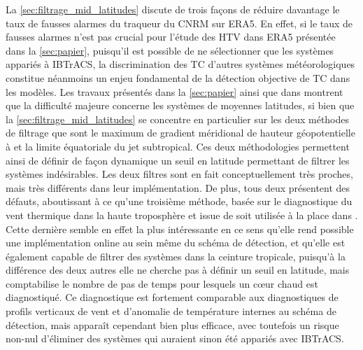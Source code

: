 \documentclass[../main.tex]{subfiles}
\begin{document}
La \cref{sec:filtrage_mid_latitudes} discute de trois façons de réduire davantage le taux de fausses alarmes du traqueur du CNRM sur ERA5. En effet, si le taux
de fausses alarmes n'est pas crucial pour l'étude des HTV dans ERA5 présentée dans la \cref{sec:papier}, puisqu'il est possible de ne sélectionner que les
systèmes appariés à IBTrACS, la discrimination des TC d'autres systèmes météorologiques constitue néanmoins un enjeu fondamental de la détection objective de TC
dans les modèles. Les travaux présentés dans la \cref{sec:papier} ainsi que dans \textcite{bourdin_intercomparison_2022} montrent que la difficulté majeure
concerne les systèmes de moyennes latitudes, si bien que la \cref{sec:filtrage_mid_latitudes} se concentre en particulier sur les deux méthodes de filtrage que
sont le maximum de gradient méridional de hauteur géopotentielle à  et la limite équatoriale du jet subtropical. Ces deux méthodologies permettent
ainsi de définir de façon dynamique un seuil en latitude permettant de filtrer les systèmes indésirables. Les deux filtres sont en fait conceptuellement très
proches, mais très différents dans leur implémentation. De plus, tous deux présentent des défauts, aboutissant à ce qu'une troisième méthode, basée sur le
diagnostique du vent thermique dans la haute troposphère et issue de \textcite{hart_cyclone_2003} soit utilisée à la place dans \textcite{dulac_assessing_2023}.
Cette dernière semble en effet la plus intéressante en ce sens qu'elle rend possible une implémentation online au sein même du schéma de détection, et qu'elle
est également capable de filtrer des systèmes dans la ceinture tropicale, puisqu'à la différence des deux autres elle ne cherche pas à définir un seuil en
latitude, mais comptabilise le nombre de pas de temps pour lesquels un cœur chaud est diagnostiqué. Ce diagnostique est fortement comparable aux diagnostiques
de profils verticaux de vent et d'anomalie de température internes au schéma de détection, mais apparaît cependant bien plus efficace, avec toutefois un risque
non-nul d'éliminer des systèmes qui auraient sinon été appariés avec IBTrACS.
\end{document}

